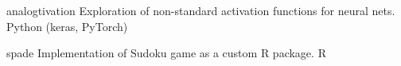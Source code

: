 

\begin{cvhonors}

  \cvhonor
    {analogtivation} %
    {Exploration of non-standard activation functions for neural nets.} %
    {Python (keras, PyTorch)} %
    {\href{https://github.com/rtjohnson12/analogtivation}{\faLink}} %
    
  \cvhonor
    {spade} %
    {Implementation of Sudoku game as a custom R package.} %
    {R} %
    {\href{https://github.com/rtjohnson12/pseudoku}{\faLink}} %

%				

\end{cvhonors}
